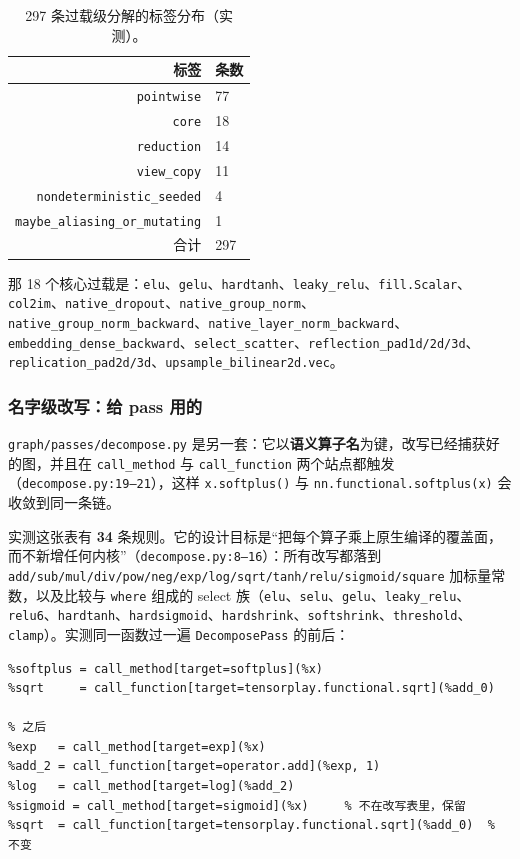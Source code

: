 \begin{table}[H]
\centering
\caption{297 条过载级分解的标签分布（实测）。}
\label{tab:fe:decomptags}
\small
\begin{tabular}{rl}
\toprule
标签 & 条数 \\
\midrule
\texttt{pointwise} & 77 \\
\texttt{core} & 18 \\
\texttt{reduction} & 14 \\
\texttt{view\_copy} & 11 \\
\texttt{nondeterministic\_seeded} & 4 \\
\texttt{maybe\_aliasing\_or\_mutating} & 1 \\
\midrule
合计 & 297 \\
\bottomrule
\end{tabular}
\end{table}

那 18 个核心过载是：\texttt{elu}、\texttt{gelu}、\texttt{hardtanh}、\texttt{leaky\_relu}、\texttt{fill.Scalar}、\texttt{col2im}、\texttt{native\_dropout}、\texttt{native\_group\_norm}、\texttt{native\_group\_norm\_backward}、\texttt{native\_layer\_norm\_backward}、\texttt{embedding\_dense\_backward}、\texttt{select\_scatter}、\texttt{reflection\_pad1d/2d/3d}、\texttt{replication\_pad2d/3d}、\texttt{upsample\_bilinear2d.vec}。

\subsubsection{名字级改写：给 pass 用的}

\texttt{graph/passes/decompose.py} 是另一套：它以\textbf{语义算子名}为键，改写已经捕获好的图，并且在 \texttt{call\_method} 与 \texttt{call\_function} 两个站点都触发（\texttt{decompose.py:19--21}），这样 \texttt{x.softplus()} 与 \texttt{nn.functional.softplus(x)} 会收敛到同一条链。

实测这张表有 \textbf{34} 条规则。它的设计目标是“把每个算子乘上原生编译的覆盖面，而不新增任何内核”（\texttt{decompose.py:8--16}）：所有改写都落到 \texttt{add/sub/mul/div/pow/neg/exp/log/sqrt/tanh/relu/sigmoid/square} 加标量常数，以及比较与 \texttt{where} 组成的 select 族（\texttt{elu}、\texttt{selu}、\texttt{gelu}、\texttt{leaky\_relu}、\texttt{relu6}、\texttt{hardtanh}、\texttt{hardsigmoid}、\texttt{hardshrink}、\texttt{softshrink}、\texttt{threshold}、\texttt{clamp}）。实测同一函数过一遍 \texttt{DecomposePass} 的前后：

\begin{lstlisting}[caption={\texttt{DecomposePass} 前后（实测 \texttt{PassResult.modified=True}）。}, label=lst:fe:decomp, style=pystyle]
% 之前
%softplus = call_method[target=softplus](%x)
%sqrt     = call_function[target=tensorplay.functional.sqrt](%add_0)

% 之后
%exp   = call_method[target=exp](%x)
%add_2 = call_function[target=operator.add](%exp, 1)
%log   = call_method[target=log](%add_2)
%sigmoid = call_method[target=sigmoid](%x)     % 不在改写表里，保留
%sqrt  = call_function[target=tensorplay.functional.sqrt](%add_0)  % 不变
\end{lstlisting}

